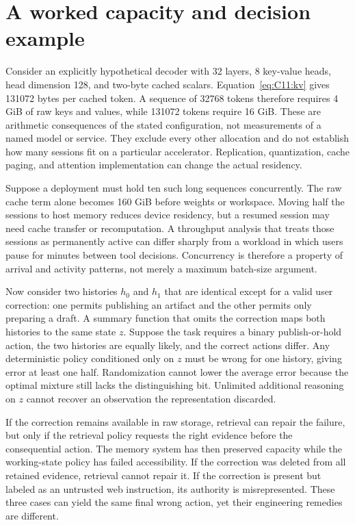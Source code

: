 \section{A worked capacity and decision example}\label{sec:C11:worked}
Consider an explicitly hypothetical decoder with 32 layers, 8 key-value heads, head dimension 128, and two-byte cached scalars. Equation~\eqref{eq:C11:kv} gives 131072 bytes per cached token. A sequence of 32768 tokens therefore requires 4 GiB of raw keys and values, while 131072 tokens require 16 GiB. These are arithmetic consequences of the stated configuration, not measurements of a named model or service. They exclude every other allocation and do not establish how many sessions fit on a particular accelerator. Replication, quantization, cache paging, and attention implementation can change the actual residency.

Suppose a deployment must hold ten such long sequences concurrently. The raw cache term alone becomes 160 GiB before weights or workspace. Moving half the sessions to host memory reduces device residency, but a resumed session may need cache transfer or recomputation. A throughput analysis that treats those sessions as permanently active can differ sharply from a workload in which users pause for minutes between tool decisions. Concurrency is therefore a property of arrival and activity patterns, not merely a maximum batch-size argument.

Now consider two histories $h_0$ and $h_1$ that are identical except for a valid user correction: one permits publishing an artifact and the other permits only preparing a draft. A summary function that omits the correction maps both histories to the same state $z$. Suppose the task requires a binary publish-or-hold action, the two histories are equally likely, and the correct actions differ. Any deterministic policy conditioned only on $z$ must be wrong for one history, giving error at least one half. Randomization cannot lower the average error because the optimal mixture still lacks the distinguishing bit. Unlimited additional reasoning on $z$ cannot recover an observation the representation discarded.

If the correction remains available in raw storage, retrieval can repair the failure, but only if the retrieval policy requests the right evidence before the consequential action. The memory system has then preserved capacity while the working-state policy has failed accessibility. If the correction was deleted from all retained evidence, retrieval cannot repair it. If the correction is present but labeled as an untrusted web instruction, its authority is misrepresented. These three cases can yield the same final wrong action, yet their engineering remedies are different.

